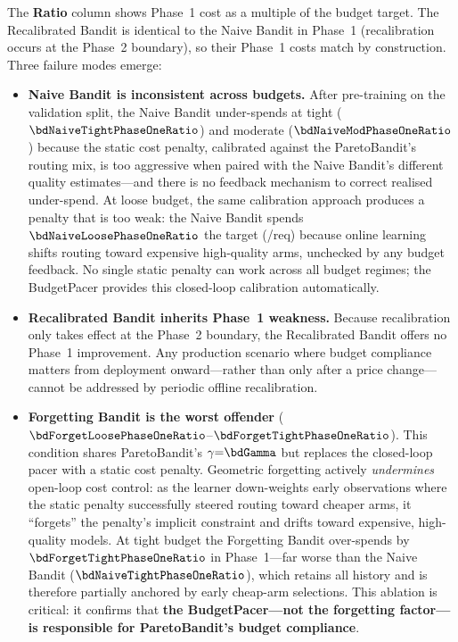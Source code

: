 \noindent
The \textbf{Ratio} column shows Phase~1 cost as a multiple of the
budget target.  The Recalibrated Bandit is identical to the Naive
Bandit in Phase~1 (recalibration occurs at the Phase~2 boundary),
so their Phase~1 costs match by construction.
Three failure modes emerge:

\begin{itemize}[nosep,leftmargin=*]
  \item \textbf{Naive Bandit is inconsistent across budgets.}
    After pre-training on the validation split, the Naive Bandit
    under-spends at tight ($\bdNaiveTightPhaseOneRatio$) and moderate
    ($\bdNaiveModPhaseOneRatio$) because the static cost penalty,
    calibrated against the ParetoBandit's routing mix, is too
    aggressive when paired with the Naive Bandit's different
    quality estimates---and there is no feedback mechanism to
    correct realised under-spend.
    At loose budget, the same calibration approach produces a penalty
    that is too weak: the Naive Bandit spends
    $\bdNaiveLoosePhaseOneRatio$ the target
    (\bdNaiveLoosePhaseOneCost/req) because online learning shifts
    routing toward expensive high-quality arms, unchecked by any
    budget feedback.
    No single static penalty can work across all budget regimes;
    the BudgetPacer provides this closed-loop calibration
    automatically.

  \item \textbf{Recalibrated Bandit inherits Phase~1 weakness.}
    Because recalibration only takes effect at the Phase~2 boundary,
    the Recalibrated Bandit offers no Phase~1 improvement.
    Any production scenario where budget compliance matters from
    deployment onward---rather than only after a price change---cannot
    be addressed by periodic offline recalibration.

  \item \textbf{Forgetting Bandit is the worst offender}
    ($\bdForgetLoosePhaseOneRatio$--$\bdForgetTightPhaseOneRatio$).
    This condition shares ParetoBandit's $\gamma{=}\bdGamma$ but replaces
    the closed-loop pacer with a static cost penalty.
    Geometric forgetting actively \emph{undermines} open-loop cost
    control: as the learner down-weights early observations where the
    static penalty successfully steered routing toward cheaper arms,
    it ``forgets'' the penalty's implicit constraint and drifts toward
    expensive, high-quality models.
    At tight budget the Forgetting Bandit over-spends by
    $\bdForgetTightPhaseOneRatio$ in Phase~1---far worse than the
    Naive Bandit ($\bdNaiveTightPhaseOneRatio$), which retains all
    history and is therefore partially anchored by early cheap-arm
    selections.
    This ablation is critical: it confirms that \textbf{the
    BudgetPacer---not the forgetting factor---is responsible for
    ParetoBandit's budget compliance}.
\end{itemize}

